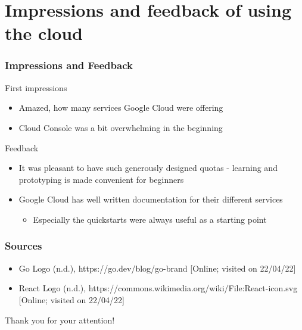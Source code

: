 \documentclass[aspectratio=169,16pt]{beamer}
\begin{document}
\section{Impressions and feedback of using the cloud}

\begin{frame}
    \frametitle{Impressions and Feedback}

    \begin{block}{\scriptsize First impressions}
        \begin{itemize} \scriptsize
            \item Amazed, how many services Google Cloud were offering
            \item Cloud Console was a bit overwhelming in the beginning
        \end{itemize}
    \end{block}

    \begin{block}{\scriptsize Feedback}
        \begin{itemize} \scriptsize
            \item It was pleasant to have such generously designed quotas - learning
                  and prototyping is made convenient for beginners
            \item Google Cloud has well written documentation for their different services
                  \begin{itemize}
                      \item Especially the quickstarts were always useful as a starting point
                  \end{itemize}
        \end{itemize}
    \end{block}
\end{frame}

\begin{frame}
    \frametitle{Sources}
    \begin{itemize} \tiny
        \item Go Logo (n.d.), https://go.dev/blog/go-brand [Online; visited on 22/04/22]
        \item React Logo (n.d.), https://commons.wikimedia.org/wiki/File:React-icon.svg [Online; visited on 22/04/22]
    \end{itemize}
\end{frame}

\begin{frame}
    \begin{center}
        \huge Thank you for your attention!
    \end{center}
\end{frame}
\end{document}
